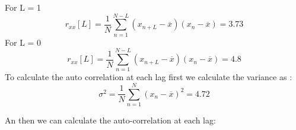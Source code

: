 \documentclass{article}
\begin{document}
   For L = 1
  \begin{equation}
      r_{xx}[L] = \frac{1}{N}\sum_{n=1}^{N - L} (x_{n+L} - \overline{x})(x_{n} - \overline{x}) = 3.73
 \end{equation}
   For L = 0
  \begin{equation}
      r_{xx}[L] = \frac{1}{N}\sum_{n=1}^{N - L} (x_{n+L} - \overline{x})(x_{n} - \overline{x}) = 4.8
 \end{equation}
 To calculate the auto correlation at each lag first we calculate the variance as :
   \begin{equation}
      \sigma^2 = \frac{1}{N}\sum_{n=1}^{N} (x_{n} - \overline{x})^2 = 4.72
 \end{equation}

 An then we can calculate the auto-correlation at each lag:
\end{document}
